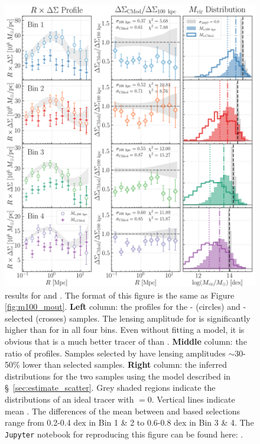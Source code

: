\documentclass[fleqn,usenatbib,useAMS]{mnras}
\begin{document}
\begin{CJK*}{UTF8}{gbsn}
\begin{figure}
    \centering
    \includegraphics[width=\textwidth]{figure/fig_7}
    \caption{\topn{} results for  and \mcmodel{}. 
        The format of this figure is the same as Figure \ref{fig:m100_mout}. 
        \textbf{Left} column: the \rdsigma{}
        profiles for the - (circles) and \mcmodel{}-selected (crosses) samples. 
        The lensing amplitude for  is significantly higher than for \mcmodel{} in all
        four bins. 
        Even without fitting a model, it is obvious that  is a much better tracer of
        \mvir{} than \mcmodel{}. 
        \textbf{Middle} column: the ratio of \dsigma{} profiles. 
        Samples selected by \mcmodel{} have lensing amplitudes $\sim$30-50\% lower than 
        selected samples. 
        \textbf{Right} column: the inferred \mvir{} distributions for the two samples using the
        model described in \S\ \ref{sec:estimate_scatter}.
        Grey shaded regions indicate the \mvir{} distributions of an ideal tracer with
        \sigmh{}$=0$. 
        Vertical lines indicate mean \mvir{}. 
        The differences of the mean \mvir{} between \mcmodel{} and  based selections
        range from 0.2-0.4 dex in Bin 1 \& 2 to 0.6-0.8 dex in Bin 3 \& 4.
        The \texttt{Jupyter} notebook for reproducing this figure can be found here:
        \href{https://github.com/dr-guangtou/jianbing/blob/master/notebooks/figure/fig7.ipynb}{\faGithub}.
        }
    \label{fig:m100_cmod}
\end{figure}


\end{CJK*}
\end{document}

